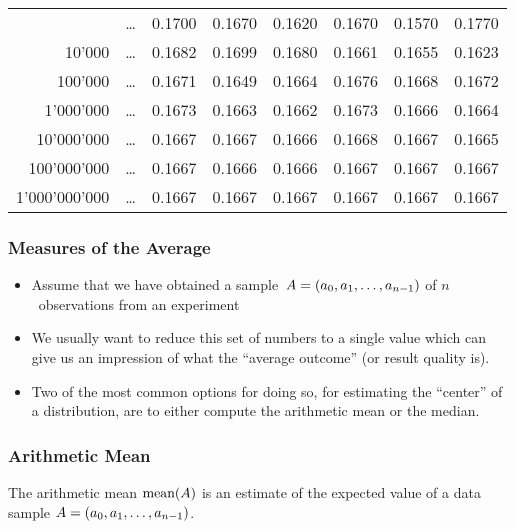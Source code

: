 \documentclass[mathserif]{beamer}%
\begin{document}
\begin{frame}[t]
{\begin{center}
{\begin{tabular}{rccccccc}
{{{{{{{{1'000&\dots&0.1700&0.1670&0.1620&0.1670&0.1570&0.1770\\%
10'000&\dots&0.1682&0.1699&0.1680&0.1661&0.1655&0.1623\\%
100'000&\dots&0.1671&0.1649&0.1664&0.1676&0.1668&0.1672\\%
1'000'000&\dots&0.1673&0.1663&0.1662&0.1673&0.1666&0.1664%
\only<16->{\\10'000'000&\dots&0.1667&0.1667&0.1666&0.1668&0.1667&0.1665\\%
100'000'000&\dots&0.1667&0.1666&0.1666&0.1667&0.1667&0.1667\\%
1'000'000'000&\dots&0.1667&0.1667&0.1667&0.1667&0.1667&0.1667%
}}}}}}}}}\\%
\hline%
\end{tabular}%
}%
\end{center}%
}%
%
%
%
%
%
\end{frame}%
%
\begin{frame}%
\frametitle{Measures of the Average}%
\begin{itemize}%
\item Assume that we have obtained a sample~$A=(a_{0}, a_{1}, \ldots, a_{n-1})$ of $n$~observations from an experiment%
\item<3-> We usually want to reduce this set of numbers to a single value which can give us an impression of what the ``average outcome'' (or result quality is).%
\item<4-> Two of the most common options for doing so, for estimating the ``center'' of a distribution, are to either compute the \alert{arithmetic mean} or the \alert{median}.%
\end{itemize}%
\end{frame}%
%
\begin{frame}%
\frametitle{Arithmetic Mean}%
%
\begin{definition}%
The arithmetic mean $\textrm{mean}(A)$ is an \alert{estimate} of the expected value of a data sample $A=(a_{0},a_{1},\ldots,a_{n-1})$.%
%
\end{definition}%
\end{frame}%
\end{document}
